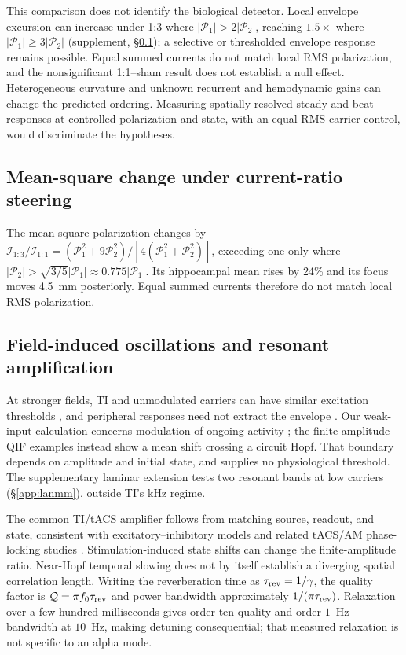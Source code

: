 \documentclass[11pt,a4paper]{article}
\newif\ifjne
\begin{document}
This comparison does not identify the biological detector. Local envelope
excursion can increase under 1:3 where $|\mathcal P_1|>2|\mathcal P_2|$,
reaching $1.5\times$ where $|\mathcal P_1|\geq3|\mathcal P_2|$ (supplement,
\S\ref{supp:steering-algebra}); a selective or thresholded envelope response
remains possible. Equal summed currents do not match local RMS polarization,
and the nonsignificant 1:1--sham result does not establish a null effect.
Heterogeneous curvature and unknown recurrent and hemodynamic gains can change
the predicted ordering. Measuring spatially resolved steady and beat responses
at controlled polarization and state, with an equal-RMS carrier control,
would discriminate the hypotheses.
\ifjne\else
\subsection{Mean-square change under current-ratio steering}\label{supp:steering-algebra}
The mean-square polarization
changes by $\mathcal I_{1:3}/\mathcal I_{1:1}
=(\mathcal P_1^2+9\mathcal P_2^2)/[4(\mathcal P_1^2+\mathcal P_2^2)]$,
exceeding one only where $|\mathcal P_2|>\sqrt{3/5}|\mathcal P_1|
\approx0.775|\mathcal P_1|$. Its hippocampal mean rises by 24\% and its focus
moves 4.5~mm posteriorly. Equal summed currents therefore do not match local
RMS polarization.

\fi

\subsection{Field-induced oscillations and resonant amplification}
At stronger fields, TI and unmodulated carriers can have similar excitation
thresholds \cite{opancar2025,semenov2025}, and peripheral responses need not
extract the envelope \cite{peripheral2023}. Our weak-input calculation concerns
modulation of ongoing activity \cite{vieira2024}; the finite-amplitude
QIF examples instead show a mean shift crossing a circuit Hopf. That boundary
depends on amplitude and initial state, and supplies no physiological threshold.
The supplementary laminar extension tests two resonant bands at low carriers
(\S\ref{app:lanmm}), outside TI's kHz regime.

The common TI/tACS amplifier follows from matching source, readout, and state,
consistent with excitatory--inhibitory models \cite{ledoux2011,clusella2023}
and related tACS/AM phase-locking studies
\cite{ali2013,negahbani2018,krause2023}. Stimulation-induced state shifts can
change the finite-amplitude ratio. Near-Hopf temporal slowing does not by itself
establish a diverging spatial correlation length. Writing the reverberation
time as $\tau_{\rm rev}=1/\gamma$, the quality factor is
$\mathcal Q=\pi f_0\tau_{\rm rev}$ and power bandwidth approximately
$1/(\pi\tau_{\rm rev})$. Relaxation over a few hundred milliseconds
\cite{wilting2018} gives order-ten quality and order-$1$~Hz bandwidth at
$10$~Hz, making detuning consequential; that measured relaxation is not
specific to an alpha mode.
\end{document}
